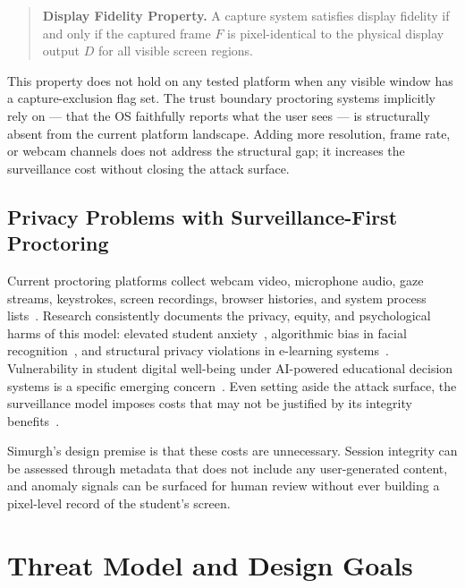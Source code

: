 \documentclass[conference]{IEEEtran}
\begin{document}
\begin{quote}
\textbf{Display Fidelity Property.} A capture system satisfies display fidelity if and only if the captured frame $F$ is pixel-identical to the physical display output $D$ for all visible screen regions.
\end{quote}

This property does not hold on any tested platform when any visible window has a capture-exclusion flag set. The trust boundary proctoring systems implicitly rely on --- that the OS faithfully reports what the user sees --- is structurally absent from the current platform landscape. Adding more resolution, frame rate, or webcam channels does not address the structural gap; it increases the surveillance cost without closing the attack surface.

\subsection{Privacy Problems with Surveillance-First Proctoring}

Current proctoring platforms collect webcam video, microphone audio, gaze streams, keystrokes, screen recordings, browser histories, and system process lists~\cite{balash2023educators,balash2021examining}. Research consistently documents the privacy, equity, and psychological harms of this model: elevated student anxiety~\cite{conijn2022fear}, algorithmic bias in facial recognition~\cite{mukherjee2024balancing}, and structural privacy violations in e-learning systems~\cite{paris2021sins}. Vulnerability in student digital well-being under AI-powered educational decision systems is a specific emerging concern~\cite{prinsloo2024vulnerable}. Even setting aside the attack surface, the surveillance model imposes costs that may not be justified by its integrity benefits~\cite{duncan2022necessity,khalil2022nexus}.

Simurgh's design premise is that these costs are unnecessary. Session integrity can be assessed through metadata that does not include any user-generated content, and anomaly signals can be surfaced for human review without ever building a pixel-level record of the student's screen.

\section{Threat Model and Design Goals}
\end{document}

